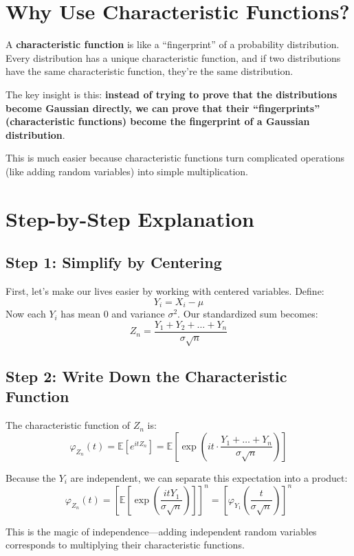 \documentclass[12pt]{article}
\begin{document}
\section*{Why Use Characteristic Functions?}

A \textbf{characteristic function} is like a ``fingerprint'' of a probability distribution. Every distribution has a unique characteristic function, and if two distributions have the same characteristic function, they're the same distribution.

The key insight is this: \textbf{instead of trying to prove that the distributions become Gaussian directly, we can prove that their ``fingerprints'' (characteristic functions) become the fingerprint of a Gaussian distribution}.

This is much easier because characteristic functions turn complicated operations (like adding random variables) into simple multiplication.

\section*{Step-by-Step Explanation}

\subsection*{Step 1: Simplify by Centering}

First, let's make our lives easier by working with centered variables. Define:
\[
Y_i = X_i - \mu
\]
Now each $Y_i$ has mean 0 and variance $\sigma^2$. Our standardized sum becomes:
\[
Z_n = \frac{Y_1 + Y_2 + \dots + Y_n}{\sigma\sqrt{n}}
\]

\subsection*{Step 2: Write Down the Characteristic Function}

The characteristic function of $Z_n$ is:
\[
\varphi_{Z_n}(t) = \mathbb{E}\left[e^{itZ_n}\right] = \mathbb{E}\left[\exp\left(it \cdot \frac{Y_1 + \dots + Y_n}{\sigma\sqrt{n}}\right)\right]
\]

Because the $Y_i$ are independent, we can separate this expectation into a product:
\[
\varphi_{Z_n}(t) = \left[\mathbb{E}\left[\exp\left(\frac{itY_1}{\sigma\sqrt{n}}\right)\right]\right]^n = \left[\varphi_{Y_1}\left(\frac{t}{\sigma\sqrt{n}}\right)\right]^n
\]

This is the magic of independence---adding independent random variables corresponds to multiplying their characteristic functions.
\end{document}

